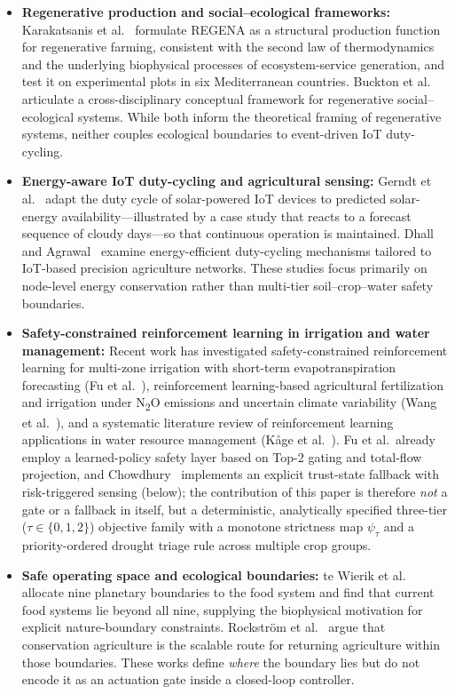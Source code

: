 \documentclass[11pt,a4paper]{article}
\begin{document}
\begin{itemize}
  \item \textbf{Regenerative production and social--ecological frameworks:} Karakatsanis et al.~\cite{karakatsanis_2026} formulate REGENA as a structural production function for regenerative farming, consistent with the second law of thermodynamics and the underlying biophysical processes of ecosystem-service generation, and test it on experimental plots in six Mediterranean countries. Buckton et al.~\cite{buckton_2023} articulate a cross-disciplinary conceptual framework for regenerative social--ecological systems. While both inform the theoretical framing of regenerative systems, neither couples ecological boundaries to event-driven IoT duty-cycling.
  \item \textbf{Energy-aware IoT duty-cycling and agricultural sensing:} Gerndt et al.~\cite{gerndt_2025} adapt the duty cycle of solar-powered IoT devices to predicted solar-energy availability---illustrated by a case study that reacts to a forecast sequence of cloudy days---so that continuous operation is maintained. Dhall and Agrawal~\cite{dhall_2018} examine energy-efficient duty-cycling mechanisms tailored to IoT-based precision agriculture networks. These studies focus primarily on node-level energy conservation rather than multi-tier soil--crop--water safety boundaries.
  \item \textbf{Safety-constrained reinforcement learning in irrigation and water management:} Recent work has investigated safety-constrained reinforcement learning for multi-zone irrigation with short-term evapotranspiration forecasting (Fu et al.~\cite{water_2026}), reinforcement learning-based agricultural fertilization and irrigation under N\textsubscript{2}O emissions and uncertain climate variability (Wang et al.~\cite{agrieng_2025}), and a systematic literature review of reinforcement learning applications in water resource management (K{\aa}ge et al.~\cite{frontiers_water_2025}). Fu et al.\ already employ a learned-policy safety layer based on Top-2 gating and total-flow projection, and Chowdhury~\cite{jalrakshak_2026} implements an explicit trust-state fallback with risk-triggered sensing (below); the contribution of this paper is therefore \emph{not} a gate or a fallback in itself, but a deterministic, analytically specified three-tier ($\tau \in \{0,1,2\}$) objective family with a monotone strictness map $\psi_\tau$ and a priority-ordered drought triage rule across multiple crop groups.
  \item \textbf{Safe operating space and ecological boundaries:} te Wierik et al.~\cite{sos_food_2025} allocate nine planetary boundaries to the food system and find that current food systems lie beyond all nine, supplying the biophysical motivation for explicit nature-boundary constraints. Rockstr\"om et al.~\cite{ca_boundaries_2026} argue that conservation agriculture is the scalable route for returning agriculture within those boundaries. These works define \emph{where} the boundary lies but do not encode it as an actuation gate inside a closed-loop controller.

\end{itemize}
\end{document}
